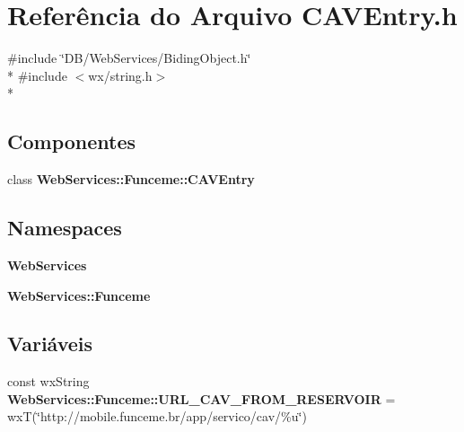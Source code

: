 \section{Referência do Arquivo C\+A\+V\+Entry.\+h}
\label{_c_a_v_entry_8h}
{\ttfamily \#include \char`\"{}D\+B/\+Web\+Services/\+Biding\+Object.\+h\char`\"{}}\\*
{\ttfamily \#include $<$wx/string.\+h$>$}\\*
\subsection*{Componentes}
\begin{DoxyCompactItemize}
\item 
class {\bf Web\+Services\+::\+Funceme\+::\+C\+A\+V\+Entry}
\end{DoxyCompactItemize}
\subsection*{Namespaces}
\begin{DoxyCompactItemize}
\item 
 {\bf Web\+Services}
\item 
 {\bf Web\+Services\+::\+Funceme}
\end{DoxyCompactItemize}
\subsection*{Variáveis}
\begin{DoxyCompactItemize}
\item 
const wx\+String {\bf Web\+Services\+::\+Funceme\+::\+U\+R\+L\+\_\+\+C\+A\+V\+\_\+\+F\+R\+O\+M\+\_\+\+R\+E\+S\+E\+R\+V\+O\+IR} = wxT(\char`\"{}http\+://mobile.\+funceme.\+br/app/servico/cav/\%u\char`\"{})
\end{DoxyCompactItemize}
